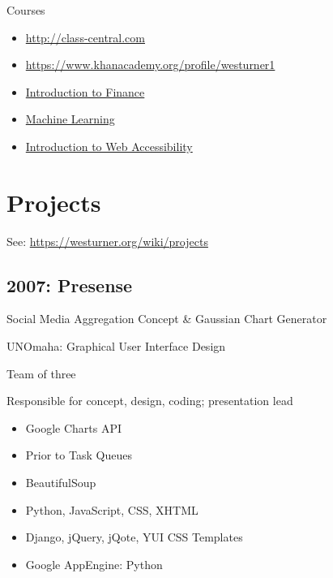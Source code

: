 \documentclass[letter,,openany,oneside]{sphinxhowto}
\begin{document}
Courses
\begin{itemize}
\item {} 
\url{http://class-central.com}

\item {} 
\url{https://www.khanacademy.org/profile/westurner1}

\item {} 
\href{https://www.coursera.org/course/introfinance}{Introduction to Finance}

\item {} 
\href{https://www.coursera.org/course/ml}{Machine Learning}

\item {} 
\href{https://webaccessibility.withgoogle.com/course}{Introduction to Web Accessibility}

\end{itemize}


\section{Projects}
\label{resume:projects}
See: \url{https://westurner.org/wiki/projects}


\subsection{2007: Presense}
\label{resume:presense}
\begin{DUlineblock}{0em}
\item[] Social Media Aggregation Concept \& Gaussian Chart Generator
\item[] UNOmaha: Graphical User Interface Design
\item[] Team of three
\item[] Responsible for concept, design, coding; presentation lead
\end{DUlineblock}
\begin{itemize}
\item {} 
Google Charts API

\item {} 
Prior to Task Queues

\item {} 
BeautifulSoup

\item {} 
Python, JavaScript, CSS, XHTML

\item {} 
Django, jQuery, jQote, YUI CSS Templates

\item {} 
Google AppEngine: Python

\end{itemize}
\end{document}
